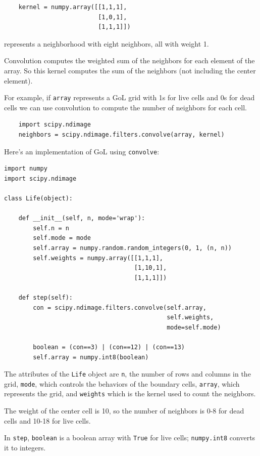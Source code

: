 \documentclass[10pt]{book}
\begin{document}
\begin{verbatim}
    kernel = numpy.array([[1,1,1],
                          [1,0,1],
                          [1,1,1]])
\end{verbatim}

represents a neighborhood with eight neighbors, all with weight 1.

Convolution computes the weighted sum of the neighbors for each
element of the array.  So this kernel computes the sum of the
neighbors (not including the center element).

For example, if {\tt array} represents a GoL grid with 1s for live
cells and 0s for dead cells we can use convolution to compute the
number of neighbors for each cell.

\begin{verbatim}
    import scipy.ndimage
    neighbors = scipy.ndimage.filters.convolve(array, kernel)
\end{verbatim}

Here's an implementation of GoL using {\tt convolve}:

\begin{verbatim}
import numpy
import scipy.ndimage

class Life(object):

    def __init__(self, n, mode='wrap'):
        self.n = n
        self.mode = mode
        self.array = numpy.random.random_integers(0, 1, (n, n))
        self.weights = numpy.array([[1,1,1],
                                    [1,10,1],
                                    [1,1,1]])

    def step(self):
        con = scipy.ndimage.filters.convolve(self.array,
                                             self.weights,
                                             mode=self.mode)

        boolean = (con==3) | (con==12) | (con==13)
        self.array = numpy.int8(boolean)
\end{verbatim}

The attributes of the {\tt Life} object are {\tt n}, the number
of rows and columns in the grid, {\tt mode}, which controls the
behaviors of the boundary cells, {\tt array}, which represents
the grid, and {\tt weights} which is the kernel used to count
the neighbors.

The weight of the center cell is 10, so the number of neighbors
is 0-8 for dead cells and 10-18 for live cells.

In {\tt step}, {\tt boolean} is a boolean array with {\tt True}
for live cells;  {\tt numpy.int8} converts it to integers.
\end{document}
